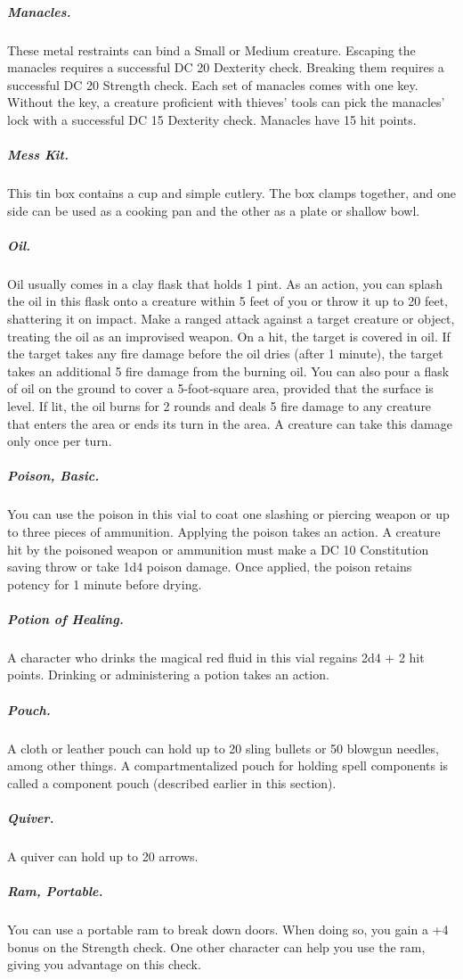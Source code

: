 \subparagraph*{Manacles.} These metal restraints can bind a Small or Medium creature. Escaping the manacles requires a successful DC 20 Dexterity check. Breaking them requires a successful DC 20 Strength check. Each set of manacles comes with one key. Without the key, a creature proficient with thieves' tools can pick the manacles' lock with a successful DC 15 Dexterity check. Manacles have 15 hit points.

\subparagraph*{Mess Kit.} This tin box contains a cup and simple cutlery. The box clamps together, and one side can be used as a cooking pan and the other as a plate or shallow bowl.

\subparagraph*{Oil.} Oil usually comes in a clay flask that holds 1 pint. As an action, you can splash the oil in this flask onto a creature within 5 feet of you or throw it up to 20 feet, shattering it on impact. Make a ranged attack against a target creature or object, treating the oil as an improvised weapon. On a hit, the target is covered in oil. If the target takes any fire damage before the oil dries (after 1 minute), the target takes an additional 5 fire damage from the burning oil. You can also pour a flask of oil on the ground to cover a 5-foot-square area, provided that the surface is level. If lit, the oil burns for 2 rounds and deals 5 fire damage to any creature that enters the area or ends its turn in the area. A creature can take this damage only once per turn.

\subparagraph*{Poison, Basic.} You can use the poison in this vial to coat one slashing or piercing weapon or up to three pieces of ammunition. Applying the poison takes an action. A creature hit by the poisoned weapon or ammunition must make a DC 10 Constitution saving throw or take 1d4 poison damage. Once applied, the poison retains potency for 1 minute before drying.

\subparagraph*{Potion of Healing.} A character who drinks the magical red fluid in this vial regains 2d4 + 2 hit points. Drinking or administering a potion takes an action.

\subparagraph*{Pouch.} A cloth or leather pouch can hold up to 20 sling bullets or 50 blowgun needles, among other things. A compartmentalized pouch for holding spell components is called a component pouch (described earlier in this section). 

\subparagraph*{Quiver.} A quiver can hold up to 20 arrows.

\subparagraph*{Ram, Portable.} You can use a portable ram to break down doors. When doing so, you gain a +4 bonus on the Strength check. One other character can help you use the ram, giving you advantage on this check.

